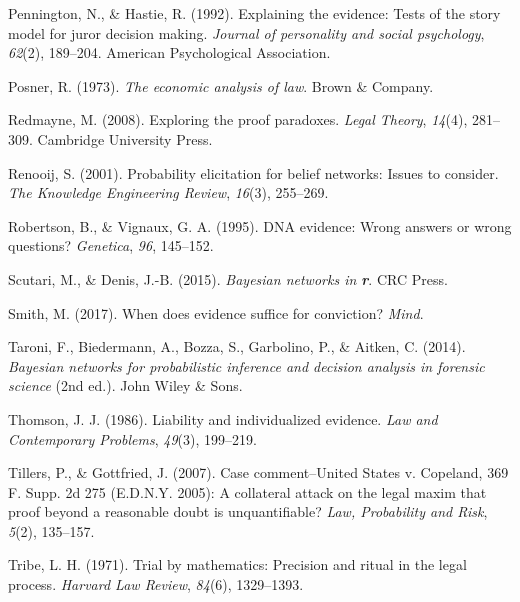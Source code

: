 \documentclass[11pt,dvipsnames,enabledeprecatedfontcommands]{scrartcl}
\begin{document}
\leavevmode\hypertarget{ref-pennington1992explaining}{}%
Pennington, N., \& Hastie, R. (1992). Explaining the evidence: Tests of
the story model for juror decision making. \emph{Journal of personality
and social psychology}, \emph{62}(2), 189--204. American Psychological
Association.

\leavevmode\hypertarget{ref-Posner1973}{}%
Posner, R. (1973). \emph{The economic analysis of law}. Brown \&
Company.

\leavevmode\hypertarget{ref-redmayne2008exploring}{}%
Redmayne, M. (2008). Exploring the proof paradoxes. \emph{Legal Theory},
\emph{14}(4), 281--309. Cambridge University Press.

\leavevmode\hypertarget{ref-renooij2001ProbabilityElicitationBeliefa}{}%
Renooij, S. (2001). Probability elicitation for belief networks: Issues
to consider. \emph{The Knowledge Engineering Review}, \emph{16}(3),
255--269.

\leavevmode\hypertarget{ref-Robertson1995evidence}{}%
Robertson, B., \& Vignaux, G. A. (1995). DNA evidence: Wrong answers or
wrong questions? \emph{Genetica}, \emph{96}, 145--152.

\leavevmode\hypertarget{ref-Scutari2015Bayesian-Networ}{}%
Scutari, M., \& Denis, J.-B. (2015). \emph{Bayesian networks in
\textbf{{r}}}. CRC Press.

\leavevmode\hypertarget{ref-Smith_conviction_mind_2017}{}%
Smith, M. (2017). When does evidence suffice for conviction?
\emph{Mind}.

\leavevmode\hypertarget{ref-taroni2006bayesian}{}%
Taroni, F., Biedermann, A., Bozza, S., Garbolino, P., \& Aitken, C.
(2014). \emph{Bayesian networks for probabilistic inference and decision
analysis in forensic science} (2nd ed.). John Wiley \& Sons.

\leavevmode\hypertarget{ref-Thomson86}{}%
Thomson, J. J. (1986). Liability and individualized evidence. \emph{Law
and Contemporary Problems}, \emph{49}(3), 199--219.

\leavevmode\hypertarget{ref-Tillers2007}{}%
Tillers, P., \& Gottfried, J. (2007). Case comment--United States v.
Copeland, 369 F. Supp. 2d 275 (E.D.N.Y. 2005): A collateral attack on
the legal maxim that proof beyond a reasonable doubt is unquantifiable?
\emph{Law, Probability and Risk}, \emph{5}(2), 135--157.

\leavevmode\hypertarget{ref-tribe71}{}%
Tribe, L. H. (1971). Trial by mathematics: Precision and ritual in the
legal process. \emph{Harvard Law Review}, \emph{84}(6), 1329--1393.
\end{document}
